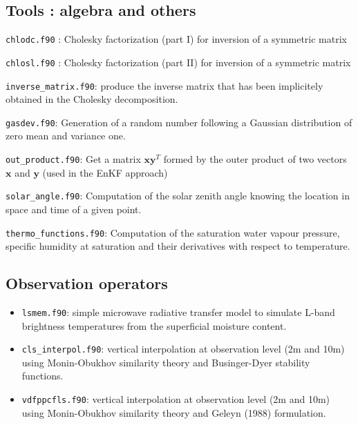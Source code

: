 \documentclass[12pt]{article}
\begin{document}
\subsection{Tools : algebra and others}
\begin{description}
\item {\tt chlodc.f90} : Cholesky factorization (part I) for inversion of a symmetric matrix
\item {\tt chlosl.f90} : Cholesky factorization (part II) for inversion of a symmetric matrix
\item {\tt inverse\_matrix.f90}: produce the inverse matrix that has been implicitely obtained
in the Cholesky decomposition.
\item {\tt gasdev.f90}:  Generation of a random number following a Gaussian distribution of zero mean and 
variance one.
\item {\tt out\_product.f90}: Get a matrix $\mathbf{xy}^T$ formed
by the outer product of two vectors $\mathbf{x}$ and $\mathbf{y}$ (used in the EnKF approach) 
\item {\tt solar\_angle.f90}: Computation of the solar zenith angle knowing the location in space
and time of a given point.
\item {\tt thermo\_functions.f90}: Computation of the saturation water vapour pressure, specific
humidity at saturation and their derivatives with respect to temperature.
\end{description}
\subsection{Observation operators}
\begin{itemize}
\item {\tt lsmem.f90}: simple microwave radiative transfer model to simulate L-band
brightness temperatures from the superficial moisture content.
\item {\tt cls\_interpol.f90}: vertical interpolation at observation level (2m and 10m) using
Monin-Obukhov similarity theory and Businger-Dyer stability functions.
\item {\tt vdfppcfls.f90}: vertical interpolation at observation level (2m and 10m) using
Monin-Obukhov similarity theory and Geleyn (1988) formulation.
\end{itemize}
\end{document}
